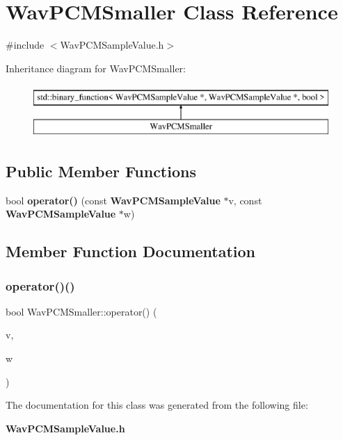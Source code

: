 \section{Wav\+P\+C\+M\+Smaller Class Reference}
\label{classWavPCMSmaller}


{\ttfamily \#include $<$Wav\+P\+C\+M\+Sample\+Value.\+h$>$}

Inheritance diagram for Wav\+P\+C\+M\+Smaller\+:\begin{figure}[H]
\begin{center}
\leavevmode
\includegraphics[height=2.000000cm]{classWavPCMSmaller}
\end{center}
\end{figure}
\subsection*{Public Member Functions}
\begin{DoxyCompactItemize}
\item 
bool \textbf{ operator()} (const \textbf{ Wav\+P\+C\+M\+Sample\+Value} $\ast$v, const \textbf{ Wav\+P\+C\+M\+Sample\+Value} $\ast$w)
\end{DoxyCompactItemize}


\subsection{Member Function Documentation}
\mbox{\label{classWavPCMSmaller_a993ea6043355626967fc854f75effe13}} 
\subsubsection{operator()()}
{\footnotesize\ttfamily bool Wav\+P\+C\+M\+Smaller\+::operator() (\begin{DoxyParamCaption}\item[{const \textbf{ Wav\+P\+C\+M\+Sample\+Value} $\ast$}]{v,  }\item[{const \textbf{ Wav\+P\+C\+M\+Sample\+Value} $\ast$}]{w }\end{DoxyParamCaption})\hspace{0.3cm}{\ttfamily [inline]}}



The documentation for this class was generated from the following file\+:\begin{DoxyCompactItemize}
\item 
\textbf{ Wav\+P\+C\+M\+Sample\+Value.\+h}\end{DoxyCompactItemize}
